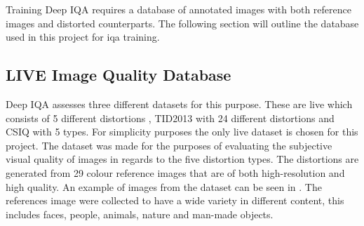 Training Deep IQA requires a database of annotated images with both reference images and distorted counterparts. The following section will outline the database used in this project for \gls{iqa} training.

\subsection{LIVE Image Quality Database}
Deep IQA assesses three different datasets for this purpose. These are \gls{live} which consists of 5 different distortions \cite{livepaper}, TID2013 \cite{tid2013} with 24 different distortions and CSIQ \cite{cisq} with 5 types. For simplicity purposes the only \gls{live} dataset is chosen for this project. The dataset was made for the purposes of evaluating the subjective visual quality of images in regards to the five distortion types. The distortions are generated from 29 colour reference images that are of both high-resolution and high quality. An example of images from the dataset can be seen in . The references image were collected to have a wide variety in different content, this includes faces, people, animals, nature and man-made objects.

